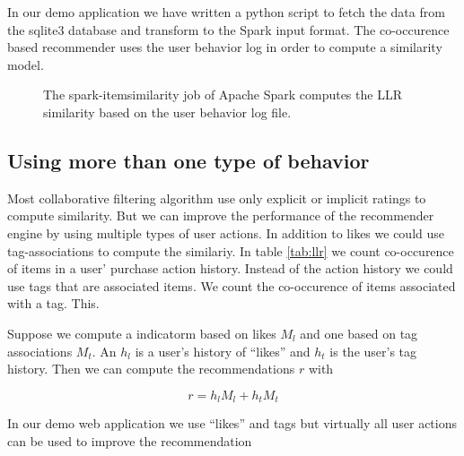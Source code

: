 In our demo application we have written a python script to fetch the data from the sqlite3 database and transform to the Spark input format.
The co-occurence based recommender uses the user behavior log in order to compute a similarity model. 

\begin{figure}
\centering
{}
\caption{The {\ttfamily spark-itemsimilarity} job of Apache Spark computes the LLR similarity based on the user behavior log file.}
\end{figure}

\subsection{Using more than one type of behavior}
\label{sec:multimodal}

Most collaborative filtering algorithm use only explicit or implicit ratings to compute similarity.
But we can improve the performance of the recommender engine by using multiple types of user actions. In addition to likes we could use tag-associations to compute the similariy. In table \ref{tab:llr} we count co-occurence of items in a user' purchase action history. Instead of the action history we could use tags that are associated items. We count the co-occurence of items associated with a tag. This. 

Suppose we compute a \gls{indicatorm} based on likes $M_l$ and one based on tag associations $M_t$. An $h_l$ is a user's history of ``likes'' and $h_t$ is the user's tag history. Then we can compute the recommendations $r$ with

\begin{equation}
  \label{eq:multi}
  r = h_l M_l + h_t M_t
\end{equation}

In our demo web application we use ``likes'' and tags but virtually all user actions can be used to improve the recommendation

